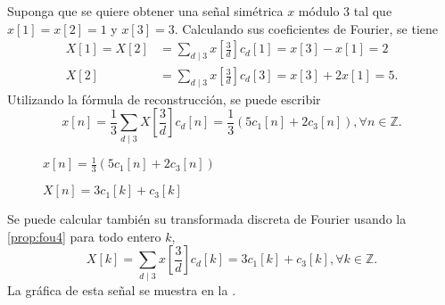 \begin{example}
Suponga que se quiere obtener una señal simétrica $x$ módulo $3$ tal que $x[1]=x[2]=1$ y $x[3]=3$. Calculando sus coeficientes de Fourier, se tiene
\begin{align*}
    X[1] = X[2] & = \sum_{d \mid 3} x \left[ \frac{3}{d} \right] c_d[1] = x[3] - x[1] = 2 \\
    X[2] & = \sum_{d \mid 3} x \left[ \frac{3}{d} \right] c_d[3] = x[3] + 2 x[1] = 5.
\end{align*}
Utilizando la fórmula de reconstrucción, se puede escribir
\begin{equation*}
x[n] = \frac{1}{3} \sum_{d \mid 3} X \left[ \frac{3}{d} \right] c_d[n] = \frac{1}{3} \left( 5 c_1[n] + 2 c_3[n] \right), \forall n \in \mathbb{Z}.
\end{equation*}

\begin{figure}
\centering
\caption{$x[n] = \frac{1}{3} (5 c_1[n] + 2 c_3 [n])$}
\label{fig:plot1}
\end{figure}

\begin{figure}
\centering
\caption{$X[n] = 3 c_1[k] + c_3[k]$}
\label{fig:plot2}
\end{figure}

Se puede calcular también su transformada discreta de Fourier usando la \cref{prop:fou4} para todo entero $k$,
\begin{equation*}
    X[k] = \sum_{d \mid 3} x \left[ \frac{3}{d} \right] c_d[k] = 3 c_1[k] + c_3[k], \forall k \in \mathbb{Z}.
\end{equation*}
La gráfica de esta señal se muestra en la .
\end{example}
